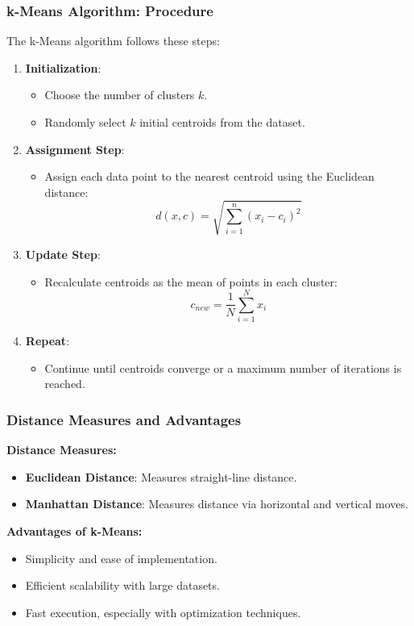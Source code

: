 \documentclass[aspectratio=169]{beamer}
\begin{document}
\begin{frame}[fragile]
    \frametitle{k-Means Algorithm: Procedure}
    The k-Means algorithm follows these steps:
    \begin{enumerate}
        \item \textbf{Initialization}:
            \begin{itemize}
                \item Choose the number of clusters \( k \).
                \item Randomly select \( k \) initial centroids from the dataset.
            \end{itemize}
        \item \textbf{Assignment Step}:
            \begin{itemize}
                \item Assign each data point to the nearest centroid using the Euclidean distance:
                \[
                d(x, c) = \sqrt{\sum_{i=1}^{n}(x_i - c_i)^2}
                \]
            \end{itemize}
        \item \textbf{Update Step}:
            \begin{itemize}
                \item Recalculate centroids as the mean of points in each cluster:
                \[
                c_{new} = \frac{1}{N} \sum_{i=1}^{N} x_i
                \]
            \end{itemize}
        \item \textbf{Repeat}:
            \begin{itemize}
                \item Continue until centroids converge or a maximum number of iterations is reached.
            \end{itemize}
    \end{enumerate}
\end{frame}

\begin{frame}[fragile]
    \frametitle{Distance Measures and Advantages}
    \textbf{Distance Measures:}
    \begin{itemize}
        \item \textbf{Euclidean Distance}: Measures straight-line distance.
        \item \textbf{Manhattan Distance}: Measures distance via horizontal and vertical moves.
    \end{itemize}

    \textbf{Advantages of k-Means:}
    \begin{itemize}
        \item Simplicity and ease of implementation.
        \item Efficient scalability with large datasets.
        \item Fast execution, especially with optimization techniques.
    \end{itemize}
\end{frame}
\end{document}
